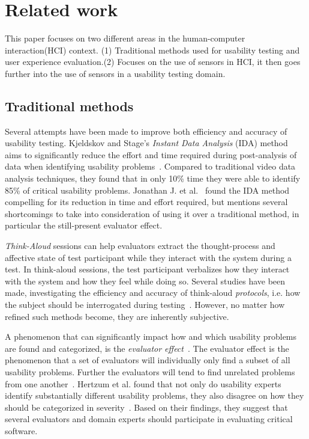 \section{Related work}
This paper focuses on two different areas in the human-computer interaction(HCI) context. (1) Traditional methods used for usability testing and user experience evaluation.(2) Focuses on the use of sensors in HCI, it then goes further into the use of sensors in a usability testing domain.

\subsection{Traditional methods}
Several attempts have been made to improve both efficiency and accuracy of
usability testing. Kjeldskov and Stage's \textit{Instant Data
Analysis} (IDA) method aims to significantly reduce the effort and time required
during post-analysis of data when identifying usability
problems~\cite{instant_data_analysis}. Compared to traditional video data
analysis techniques, they found that in only 10\% time they were able to
identify 85\% of critical usability problems. Jonathan J. et
al.~\cite{use_of_TA_and_IDA} found the IDA
method compelling for its reduction in time and effort required, but mentions
several shortcomings to take into consideration of using it over a traditional
method, in particular the still-present evaluator effect.

\textit{Think-Aloud} sessions can help evaluators extract the thought-process
and affective state of test participant while they interact with the system
during a test. In think-aloud sessions, the test participant verbalizes how
they interact with the system and how they feel while doing so.  Several studies
have been made, investigating the efficiency and accuracy of think-aloud
\textit{protocols}, i.e. how the subject should be interrogated during
testing~\cite{two_think_aloud_protocols_study}. However, no matter how refined
such methods become, they are inherently subjective.

A phenomenon that can significantly impact how and which usability problems are
found and categorized, is the \textit{evaluator effect}~\cite{eval_effect}.
The evaluator effect is the phenomenon that a set of evaluators will individually only find a subset of all usability problems.
Further the evaluators will tend to find unrelated problems from one another~\cite{eval_effect}.
Hertzum et al. found that not only do
usability experts identify substantially different usability problems, they also
disagree on how they should be categorized in
severity~\cite{eval_effect_research}. Based on their findings, they suggest that
several evaluators and domain experts should participate in evaluating critical
software.

